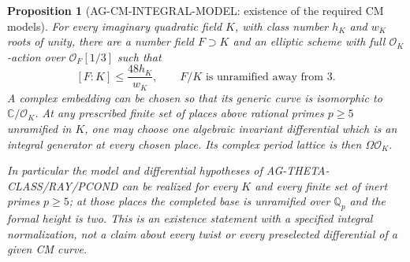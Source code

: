 \documentclass[11pt,a4paper]{article}
\newtheorem{proposition}{Proposition}
\begin{document}
\begin{proposition}[AG-CM-INTEGRAL-MODEL: existence of the required CM models]
For every imaginary quadratic field $K$, with class number $h_K$
and $w_K$ roots of unity, there are a number field $F\supset K$
and an elliptic scheme with full $\mathcal O_K$-action over
$\mathcal O_F[1/3]$ such that
\[
 [F:K]\le\frac{48h_K}{w_K},\qquad
 F/K\text{ is unramified away from }3.
\]
A complex embedding can be chosen so that its generic curve is
isomorphic to $\mathbb C/\mathcal O_K$. At any prescribed finite
set of places above rational primes $p\ge5$ unramified in $K$,
one may choose one algebraic invariant differential which is
an integral generator at every chosen place. Its complex period
lattice is then $\Omega\mathcal O_K$.

In particular the model and differential hypotheses of
AG-THETA-CLASS/RAY/PCOND can be realized for every $K$ and every
finite set of inert primes $p\ge5$; at those places the completed
base is unramified over $\mathbb Q_p$ and the formal height is two.
This is an existence statement with a specified integral
normalization, not a claim about every twist or every preselected
differential of a given CM curve.
\end{proposition}
\end{document}
